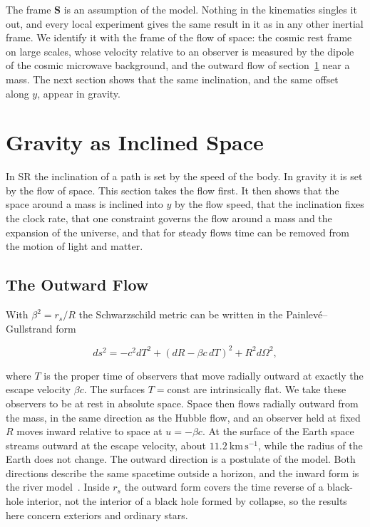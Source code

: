 \documentclass[anonymous]{iopjournal}
\begin{document}
The frame $\mathbf{S}$ is an assumption of the model. Nothing in the kinematics singles it out, and every local experiment gives the same result in it as in any other inertial frame. We identify it with the frame of the flow of space: the cosmic rest frame on large scales, whose velocity relative to an observer is measured by the dipole of the cosmic microwave background, and the outward flow of section~\ref{sec_gravity} near a mass. The next section shows that the same inclination, and the same offset along $y$, appear in gravity.

\section{Gravity as Inclined Space}\label{sec_gravity}

In SR the inclination of a path is set by the speed of the body. In gravity it is set by the flow of space. This section takes the flow first. It then shows that the space around a mass is inclined into $y$ by the flow speed, that the inclination fixes the clock rate, that one constraint governs the flow around a mass and the expansion of the universe, and that for steady flows time can be removed from the motion of light and matter.

\subsection{The Outward Flow}\label{sec_pg_relation}

With $\beta^2=r_s/R$ the Schwarzschild metric can be written in the Painlev\'e--Gullstrand form~\cite{Painleve1921,Gullstrand1922,MartelPoisson2001}

\begin{equation}\label{eq_pg_metric}
    ds^2=-c^2dT^2+\left(dR-\beta c\,dT\right)^2+R^2d\Omega^2 ,
\end{equation}

where $T$ is the proper time of observers that move radially outward at exactly the escape velocity $\beta c$. The surfaces $T=\text{const}$ are intrinsically flat. We take these observers to be at rest in absolute space. Space then flows radially outward from the mass, in the same direction as the Hubble flow, and an observer held at fixed $R$ moves inward relative to space at $u=-\beta c$. At the surface of the Earth space streams outward at the escape velocity, about $11.2~\mathrm{km\,s^{-1}}$, while the radius of the Earth does not change. The outward direction is a postulate of the model. Both directions describe the same spacetime outside a horizon, and the inward form is the river model~\cite{HamiltonLisle2008}. Inside $r_s$ the outward form covers the time reverse of a black-hole interior, not the interior of a black hole formed by collapse, so the results here concern exteriors and ordinary stars.
\end{document}
